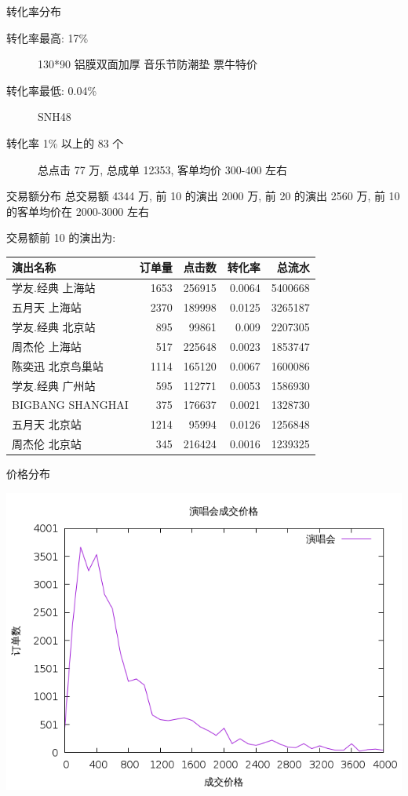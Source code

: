 \documentclass[presentation, bigger]{beamer}
\begin{document}
\begin{frame}[label={sec:org543807a}]{转化率分布}
\begin{description}
\item[{转化率最高: 17\%}] 130*90 铝膜双面加厚 音乐节防潮垫 票牛特价
\item[{转化率最低: 0.04\%}] SNH48
\item[{转化率 1\% 以上的 83 个}] 总点击 77 万, 总成单 12353, 客单均价 300-400 左右
\end{description}
\end{frame}
\begin{frame}[label={sec:org93b5adb}]{交易额分布}
总交易额 4344 万, 前 10 的演出 2000 万, 前 20 的演出 2560 万, 前 10 的客单均价在 2000-3000 左右

交易额前 10 的演出为:
\begin{center}
\begin{tabular}{lrrrr}
演出名称 & 订单量 & 点击数 & 转化率 & 总流水\\
\hline
学友.经典 上海站 & 1653 & 256915 & 0.0064 & 5400668\\
五月天 上海站 & 2370 & 189998 & 0.0125 & 3265187\\
学友.经典 北京站 & 895 & 99861 & 0.009 & 2207305\\
周杰伦 上海站 & 517 & 225648 & 0.0023 & 1853747\\
陈奕迅 北京鸟巢站 & 1114 & 165120 & 0.0067 & 1600086\\
学友.经典 广州站 & 595 & 112771 & 0.0053 & 1586930\\
BIGBANG  SHANGHAI & 375 & 176637 & 0.0021 & 1328730\\
五月天 北京站 & 1214 & 95994 & 0.0126 & 1256848\\
周杰伦 北京站 & 345 & 216424 & 0.0016 & 1239325\\
\end{tabular}
\end{center}
\end{frame}

\begin{frame}[label={sec:org57a064d}]{价格分布}
\begin{center}
\includegraphics[width=.9\linewidth]{./image/vocal-price-distribution.png}
\end{center}
\end{frame}
\end{document}
